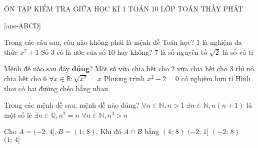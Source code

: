 \begin{name}
	{ÔN TẬP KIỂM TRA GIỮA HỌC KÌ 1}
	{TOÁN 10}
	{LỚP TOÁN THẦY PHÁT}
	{\thoigian}
\end{name}

\caulc

[ans-ABCD]
\begin{ex}%
	Trong các câu sau, câu nào không phải là mệnh đề Toán học?
	\choice
	{$1$ là nghiệm đa thức $x^2+1$}
	{\True Số $3$ có là ước của số $10$ hay không?}
	{$7$ là số nguyên tố}
	{$\sqrt{2}$ là số vô tỉ}
\end{ex}
\begin{ex}%
	Mệnh đề nào sau đây \textbf{đúng}?
	\choice
	{\True Một số vừa chia hết cho $2$ vừa chia hết cho $3$ thì nó chia hết cho $6$}
	{$\forall x\in\mathbb{R}:\sqrt{x^2}=x$}
	{Phương trình $x^2-2=0$ có nghiệm hữu tỉ}
	{Hình thoi có hai đường chéo bằng nhau}
\end{ex}
\begin{ex}%
	Trong các mệnh đề sau, mệnh đề nào đúng?
	\choice
	{$\forall n\in\mathbb{N}, n > 1$}
	{$\exists n\in\mathbb{N}, n(n+1)$ là một số lẻ}
	{\True $\exists n\in\mathbb{Q}, n^2=n$}
	{$\forall n\in\mathbb{N}, n^2> n$}
\end{ex}
\begin{ex}%
	Cho $A=(-2;\,4], B=(1;\,8)$. Khi đó $A\cap B$ bằng
\choice
{$(4;\,8)$}
{$(-2;\,1]$}
{$(-2;\,8)$}
{\True $(1;\,4]$}
\loigiai{
	Ta có $A\cap B=(1;\,4]$.
}
\end{ex}

